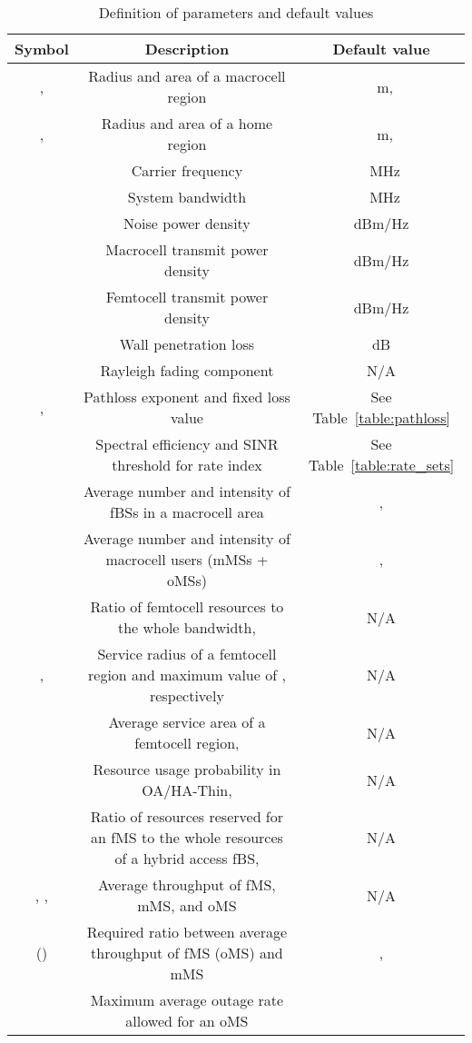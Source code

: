 \documentclass[journal]{IEEEtran}
\begin{document}
\begin{table*}[ht]  \centering
  \caption{Definition of parameters and default values}\label{table:parameters}
  \begin{tabular}{|c||c||c|}
  \hline
  Symbol & Description & Default value  \\
  \hline\hline
  ,  & Radius and area of a macrocell region  & ~m, \\ \hline
  ,  & Radius and area of a home region  & ~m, \\ \hline
 & Carrier frequency & ~MHz\\ \hline
   & System bandwidth & ~MHz\\ \hline
   & Noise power density &  dBm/Hz\\ \hline
   & Macrocell transmit power density &  dBm/Hz\\ \hline
   & Femtocell transmit power density &  dBm/Hz\\ \hline
   & Wall penetration loss &  dB\\ \hline
   & Rayleigh fading component & N/A \\ \hline
  , & Pathloss exponent and fixed loss value & See Table~\ref{table:pathloss} \\ \hline
   & Spectral efficiency and SINR threshold for rate index & See Table~\ref{table:rate_sets}\\ \hline
   & Average number and intensity of fBSs in a macrocell area & ,  \\ \hline
   & Average number and intensity of macrocell users (mMSs + oMSs)   & , \\ \hline
   & Ratio of femtocell resources to the whole bandwidth, & N/A \\ \hline
  ,  & Service radius  of a femtocell region and maximum value of , respectively  & N/A \\ \hline
   & Average service area  of a femtocell region,  & N/A \\ \hline
   & Resource usage probability in OA/HA-Thin, & N/A \\ \hline
   & Ratio of resources reserved for an fMS to the whole resources of a hybrid access fBS,  & N/A \\ \hline
  , ,  & Average throughput of fMS, mMS, and oMS  & N/A \\ \hline
   () & Required ratio between average throughput of fMS (oMS) and mMS   & , \\ \hline
    & Maximum average outage rate allowed for an oMS   &  \\ \hline
  \end{tabular}
\end{table*}
\end{document}
